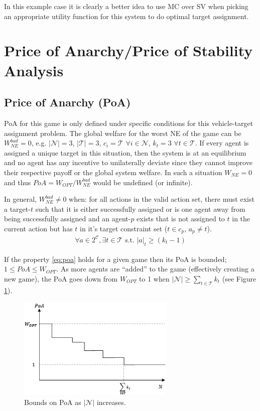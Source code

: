 \documentclass[11pt, onecolumn, compsoc, letterpaper]{article}
\newcommand{\Pl}{\mathcal{N}} %
\newcommand{\Ta}{\mathcal{T}} %
\newcommand{\Co}{\mathcal{C}} %
\begin{document}
In this example case it is clearly a better idea to use MC over SV when picking an appropriate utility function for this system to do optimal target assignment.

\section{Price of Anarchy/Price of Stability Analysis}
\subsection{Price of Anarchy (PoA)}
PoA for this game is only defined under specific conditions for this vehicle-target assignment problem. The global welfare for the worst NE of the game can be $W_{NE}^{bad} = 0$, e.g. $|\Pl| = 3$, $|\Ta| = 3$, $c_i = \Ta$ $\forall i \in \Pl$, $k_t = 3$ $\forall t \in \Ta$. If every agent is assigned a unique target in this situation, then the system is at an equilibrium and no agent has any incentive to unilaterally deviate since they cannot improve their respective payoff or the global system welfare. In such a situation $W_{NE} = 0$ and thus $PoA = W_{OPT} / W_{NE}^{bad}$ would be undefined (or infinite).

In general, $W_{NE}^{bad} \not= 0$ when: for all actions in the valid action set, there must exist a target-$t$ such that it is either successfully assigned or is one agent away from being successfully assigned and an agent-$p$ exists that is not assigned to $t$ in the current action but has $t$ in it's target constraint set ($t \in c_p$, $a_p \not= t$).
\begin{align}
	\forall a \in 2^\Co, \exists t \in \Ta \text{ s.t. } |a|_t \geq (k_t - 1)\label{eq:poa}
\end{align}

If the property \eqref{eq:poa} holds for a given game then its PoA is bounded; $1 \leq PoA \leq W_{OPT}$. As more agents are ``added'' to the game (effectively creating a new game), the PoA goes down from $W_{OPT}$ to 1 when $|\Pl| \geq \sum\limits_{t \in \Ta} k_t$ (see Figure \ref{fig:poa}).

\begin{figure}[!htb]
	\centering\includegraphics[width=7.5cm]{assets/poa.png}
	\centering\caption{Bounds on PoA as $|\Pl|$ increases.}\label{fig:poa}
\end{figure}
\end{document}
